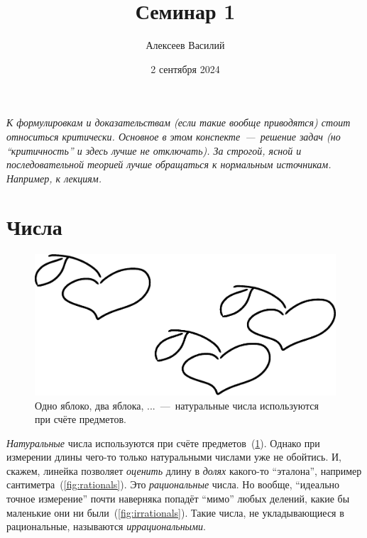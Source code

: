 \documentclass[a4paper,12pt]{article}
\author{Алексеев Василий}
\title{Семинар 1}
\date{2 сентября 2024}
\begin{document}
  \maketitle
  
  \tableofcontents

  \thispagestyle{empty}
  
  \newpage
  
  
  
  \vspace*{\fill}
  
  \noindent
  \emph{
    К формулировкам и доказательствам (если такие вообще приводятся) стоит относиться критически.
    Основное в этом конспекте~---~решение задач (но ``критичность'' и здесь лучше не отключать).
    За строгой, ясной и последовательной теорией лучше обращаться к нормальным источникам.
    Например, к лекциям.
  }
  
  \vspace*{\fill}
  
  \thispagestyle{empty}
  
  \newpage
  
  


  \section{Числа}
  
  \begin{figure}[ht]
    \centering
    \includegraphics[width=0.6\linewidth]{images/Apples}
    
    \caption{
      Одно яблоко, два яблока, ...~---~натуральные числа используются при счёте предметов.
    }
    \label{fig:naturals}
  \end{figure}
  
  
  \emph{Натуральные} числа используются при счёте предметов~(\ref{fig:naturals}).
  Однако при измерении длины чего-то только натуральными числами уже не обойтись.
  И, скажем, линейка позволяет \emph{оценить} длину в \emph{долях} какого-то ``эталона'', например сантиметра~(\ref{fig:rationals}).
  Это \emph{рациональные} числа.
  Но вообще, ``идеально точное измерение'' почти наверняка попадёт ``мимо'' любых делений, какие бы маленькие они ни были~(\ref{fig:irrationals}).
  Такие числа, не укладывающиеся в рациональные, называются \emph{иррациональными}.
  
\end{document}
